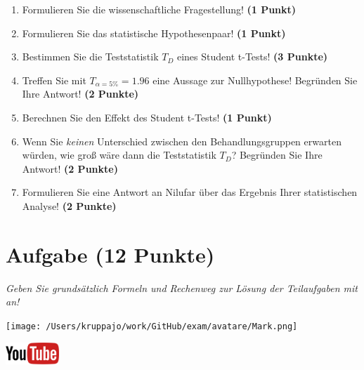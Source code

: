 \documentclass[a4paper, 9pt]{scrartcl}\usepackage[]{graphicx}\usepackage[]{xcolor}
\begin{document}
\begin{enumerate}
  \item Formulieren Sie die wissenschaftliche Fragestellung! \textbf{(1 Punkt)}
  \item Formulieren Sie das statistische Hypothesenpaar! \textbf{(1 Punkt)}
  \item Bestimmen Sie die Teststatistik $T_{D}$ eines Student t-Tests! \textbf{(3 Punkte)}
\item Treffen Sie mit $T_{\alpha = 5\%} = 1.96$ eine Aussage zur Nullhypothese! Begründen Sie Ihre Antwort! \textbf{(2 Punkte)}
\item Berechnen Sie den Effekt des Student t-Tests! \textbf{(1 Punkt)}
\item Wenn Sie \textit{keinen} Unterschied zwischen den Behandlungsgruppen erwarten würden, wie groß wäre dann die Teststatistik $T_{D}$? Begründen Sie Ihre Antwort! \textbf{(2 Punkte)}
\item Formulieren Sie eine Antwort an Nilufar über das Ergebnis Ihrer statistischen Analyse! \textbf{(2 Punkte)}
\end{enumerate} 
\clearpage

\section{Aufgabe \hfill (12 Punkte)}

\textit{Geben Sie grundsätzlich Formeln und Rechenweg zur Lösung der Teilaufgaben mit an!} \\[1Ex]
 

 
\begin{minipage}[t]{0.5\textwidth}
\texttt{[image: /Users/kruppajo/work/GitHub/exam/avatare/Mark.png]}
\end{minipage}
\begin{minipage}[t]{0.5\textwidth}
\hfill
\href{https://youtu.be/TbSEOMCQYl4}{\includegraphics[width = 2cm]{img/youtube}}\\[1Ex]
\end{minipage}
\vspace{1ex}
\end{document}
